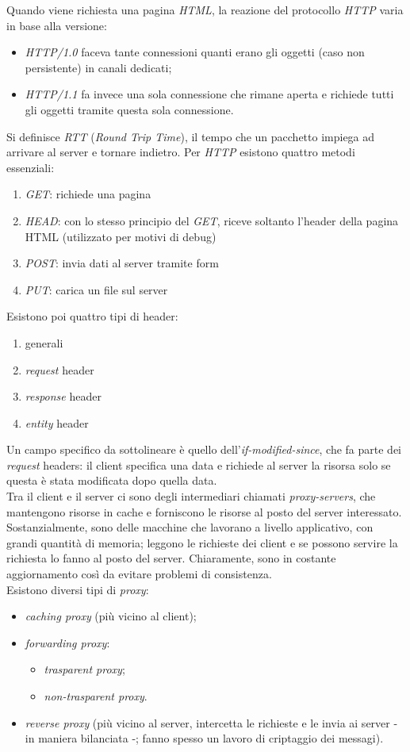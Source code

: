 Quando viene richiesta una pagina \textit{HTML}, la reazione del protocollo \textit{HTTP} varia in base alla versione:
\begin{itemize}
    \item \textit{HTTP/1.0} faceva tante connessioni quanti erano gli oggetti (caso non persistente) in canali dedicati;
    \item \textit{HTTP/1.1} fa invece una sola connessione che rimane aperta e richiede tutti gli oggetti tramite questa sola connessione.
\end{itemize}
Si definisce \textit{RTT} (\textit{Round Trip Time}), il tempo che un pacchetto impiega ad arrivare al server e tornare indietro.
Per \textit{HTTP} esistono quattro metodi essenziali:
\begin{enumerate}
    \item \textit{GET}: richiede una pagina
    \item \textit{HEAD}: con lo stesso principio del \textit{GET}, riceve soltanto l'header della pagina HTML (utilizzato per motivi di debug)
    \item \textit{POST}: invia dati al server tramite form
    \item \textit{PUT}: carica un file sul server
\end{enumerate}
Esistono poi quattro tipi di header:
\begin{enumerate}
    \item generali
    \item \textit{request} header
    \item \textit{response} header
    \item \textit{entity} header
\end{enumerate}
Un campo specifico da sottolineare è quello dell'\textit{if-modified-since}, che fa parte dei \textit{request} headers: il client specifica una data e richiede al server la risorsa solo se questa è stata modificata dopo quella data. \\
Tra il client e il server ci sono degli intermediari chiamati \textit{proxy-servers}, che mantengono risorse in cache e forniscono le risorse al posto del server interessato. Sostanzialmente, sono delle macchine che lavorano a livello applicativo, con grandi quantità di memoria; leggono le richieste dei client e se possono servire la richiesta lo fanno al posto del server. Chiaramente, sono in costante aggiornamento così da evitare problemi di consistenza. \\
Esistono diversi tipi di \textit{proxy}:
\begin{itemize}
    \item \textit{caching proxy} (più vicino al client);
    \item \textit{forwarding proxy}:
    \begin{itemize}
        \item \textit{trasparent proxy};
        \item \textit{non-trasparent proxy}.
    \end{itemize}
    \item \textit{reverse proxy} (più vicino al server, intercetta le richieste e le invia ai server - in maniera bilanciata -; fanno spesso un lavoro di criptaggio dei messagi).
\end{itemize}
